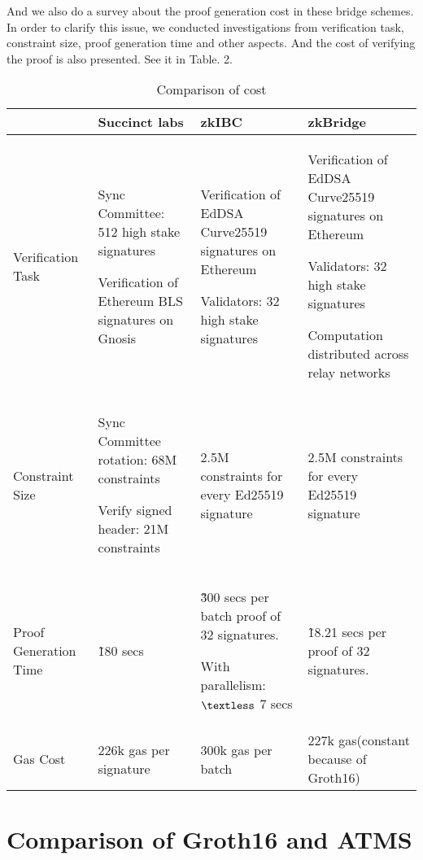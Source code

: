 \documentclass{article}
\begin{document}
And we also do a survey about the proof generation cost in these bridge schemes. In order to clarify this issue, we conducted investigations from verification task, constraint size, proof generation time and other aspects. And the cost of verifying the proof is also presented.
See it in Table. 2.


\begin{table}[H]
    \centering
    \begin{tabular}{p{2cm}p{4cm}p{4cm}p{4cm}} \hline 
                        & Succinct labs & zkIBC &  zkBridge\\ \hline
         Verification Task   
         & Sync Committee: 512 high stake signatures

         Verification of Ethereum BLS signatures on Gnosis
         &  Verification of EdDSA Curve25519 signatures on Ethereum
         
         Validators: 32 high stake signatures
         & Verification of EdDSA Curve25519 signatures on Ethereum
         
         Validators: 32 high stake signatures
         
         Computation distributed across relay networks
         \\ \hline
         Constraint Size & 
         Sync Committee rotation: 68M constraints

         Verify signed header: 21M constraints
         &
         2.5M constraints for every Ed25519 signature
         
         & 2.5M constraints for every Ed25519 signature\\ \hline

         Proof Generation Time & 
         \~180 secs
         & 
         \~300 secs per batch proof of 32 signatures.

         With parallelism: $\textless$ 7 secs
         &
         \~18.21 secs per proof of 32 signatures.
         \\ \hline 
         Gas Cost &
         226k gas per signature
         &
         300k gas per batch
         &
         227k gas(constant because of Groth16) \\  \hline
    \end{tabular}
    \caption{Comparison of cost}
    \label{tab:my_label}
\end{table}




\section{Comparison of Groth16 and ATMS}
\end{document}
